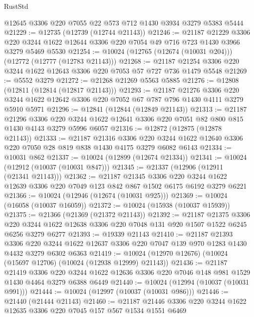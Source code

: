\begin{lexlean}{RustStd}
\begin{coremodule}
{\begin{coremodule}
{{{{{{{{{{{{{{{{{{{{{{{{{{    @12645
    @3306
    @220
    @7055
    @22
    @573
    @712
    @1430
    @3934
    @3279
    @5383
    @5444
@21229 := @12735 (@12739 (@12744 @21143))
@21246 := @21187
    @21229
    @3306
    @220
    @3244
    @1622
    @12644
    @3306
    @220
    @7054
    @49
    @716
    @723
    @1430
    @3966
    @3279
    @5469
    @5530
@21254 := @10024 (@12765 (@12674 (@10031 @204))) (@12772 (@12777 (@12783 @21143)))
@21268 := @21187 @21254 @3306 @220 @3244 @1622 @12643 @3306 @220 @7053 @57 @727 @736 @1479 @5548
@21269 := @5552 @3279
@21272 := @21268 @21269 @5563 @5885
@21276 := @12808 (@12811 (@12814 (@12817 @21143)))
@21293 := @21187
    @21276
    @3306
    @220
    @3244
    @1622
    @12642
    @3306
    @220
    @7052
    @67
    @787
    @796
    @1430
    @4111
    @3279
    @5910
    @5971
@21296 := @12841 (@12844 (@12849 @21143))
@21313 := @21187
    @21296
    @3306
    @220
    @3244
    @1622
    @12641
    @3306
    @220
    @7051
    @82
    @800
    @815
    @1430
    @4143
    @3279
    @5996
    @6057
@21316 := @12872 (@12875 (@12878 @21143))
@21333 := @21187
    @21316
    @3306
    @220
    @3244
    @1622
    @12640
    @3306
    @220
    @7050
    @28
    @819
    @838
    @1430
    @4175
    @3279
    @6082
    @6143
@21334 := @10031 @862
@21337 := @10024 (@12899 (@12674 @21334))
@21341 := @10024 (@12912 (@10037 (@10031 @847)))
@21345 := @21337 (@12906 (@12911 (@21341 @21143)))
@21362 := @21187
    @21345
    @3306
    @220
    @3244
    @1622
    @12639
    @3306
    @220
    @7049
    @123
    @842
    @867
    @1502
    @6175
    @6192
    @3279
    @6221
@21366 := @10024 (@12946 (@12674 (@10031 @925)))
@21369 := @10024 (@16058 (@10037 @16059))
@21372 := @10024 (@15938 (@10037 @15939))
@21375 := @21366 (@21369 (@21372 @21143))
@21392 := @21187
    @21375
    @3306
    @220
    @3244
    @1622
    @12638
    @3306
    @220
    @7048
    @131
    @920
    @1507
    @1522
    @6245
    @6256
    @3279
    @6277
@21393 := @19339 @21143
@21410 := @21187
    @21393
    @3306
    @220
    @3244
    @1622
    @12637
    @3306
    @220
    @7047
    @139
    @970
    @1283
    @1430
    @4432
    @3279
    @6302
    @6363
@21419 := @10024 (@12970 @12676) (@10024 (@15697 @12706) (@10024 (@12938 @12999) @21143))
@21436 := @21187
    @21419
    @3306
    @220
    @3244
    @1622
    @12636
    @3306
    @220
    @7046
    @148
    @981
    @1529
    @1430
    @4464
    @3279
    @6388
    @6449
@21440 := @10024 (@12994 (@10037 (@10031 @991)))
@21444 := @10024 (@12997 (@10037 (@10031 @986)))
@21446 := @21440 (@21444 @21143)
@21460 := @21187 @21446 @3306 @220 @3244 @1622 @12635 @3306 @220 @7045 @157 @567 @1534 @1551 @6469
}}}}}}}}}}}}}}}}}}}}}}}}}}
\end{coremodule}}
\end{coremodule}
\end{lexlean}
